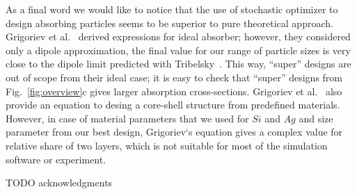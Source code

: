 \documentclass[aps,prl,twocolumn,showpacs,superscriptaddress,groupedaddress]{revtex4-1}
\begin{document}
As a final word we would like to notice that the use of stochastic
optimizer to design absorbing particles seems to be superior to pure
theoretical approach.  Grigoriev et al.~\cite{Grigoriev-2015} derived
expressions for ideal absorber; however, they considered only a dipole
approximation, the final value for our range of particle sizes is very
close to the dipole limit predicted with
Tribelsky~\cite{Tribelsky-2011}. This way, ``super'' designs are out
of scope from their ideal case; it is easy to check that ``super''
designs from Fig.~\ref{fig:overview}c gives larger absorption cross-sections.
Grigoriev et al.~\cite{Grigoriev-2015} also provide an equation to
desing a core-shell structure from predefined materials. However, in
case of material parameters that we used for $Si$ and $Ag$ and size
parameter from our best design, Grigoriev`s equation gives a complex
value for relative share of two layers, which is not suitable for
most of the simulation software or experiment.


\begin{acknowledgments}

  TODO acknowledgments
\end{acknowledgments}


\end{document}

